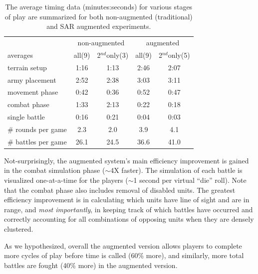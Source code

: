 \documentclass[10pt,twocolumn,letterpaper]{article}
\begin{document}
\begin{table}[tb]
\begin{center}
\begin{tabular}{@{}l|cc|cc@{}}
               & \multicolumn{2}{c|}{\small non-augmented} & \multicolumn{2}{c}{\small augmented} \\
\small averages       & \small all(9) & \small 2$^{nd}$only(3) & \small all(9) & \small 2$^{nd}$only(5) \\ \hline
\small terrain setup  & \small 1:16    & \small 1:13         & \small 2:46    & \small 2:07         \\
\small army placement & \small 2:52    & \small 2:38         & \small 3:03    & \small 3:11 \\ 
\small movement phase & \small 0:42    & \small 0:36         & \small 0:52    & \small 0:47 \\
\small combat phase   & \small 1:33    & \small 2:13         & \small 0:22    & \small 0:18 \\
\small single battle  & \small 0:16    & \small 0:21         & \small 0:04    & \small 0:03 \\ \hline
\small \# rounds per game & \small 2.3  & \small 2.0         & \small 3.9     & \small 4.1 \\
\small \# battles per game & \small 26.1   & \small 24.5   & \small  36.6    & \small 41.0 
\end{tabular}
\end{center}%
\vspace{-0.05in}
\caption{ The average timing data (minutes:seconds) for various stages
  of play are summarized for both non-augmented (traditional) and
  SAR augmented experiments.
\label{table:timing_stats}
}
\vspace{-0.1in}
\end{table}

Not-surprisingly, the augmented system's main efficiency improvement
is gained in the combat simulation phase ($\sim$4X faster).  The
simulation of each battle is visualized one-at-a-time for the players
($\sim$1 second per virtual ``die'' roll).  Note that the combat phase
also includes removal of disabled units.
The greatest efficiency improvement is in calculating which units have
line of sight and are in range, and {\em most importantly}, in keeping
track of which battles have occurred and correctly accounting for all
combinations of opposing units when they are densely clustered.

As we hypothesized, overall the augmented version allows players to
complete more cycles of play before time is called (60\% more),
and similarly, more total battles are fought (40\% more) in the
augmented version.
\end{document}
